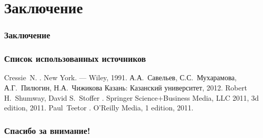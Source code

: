 \documentclass{beamer}
\begin{document}
\section{Заключение}
\begin{frame}
  \frametitle{Заключение}
\end{frame}

\begin{frame}
  \frametitle{Список использованных источников}
  \begin{scriptsize}
  \begin{thebibliography}{5}
    \beamertemplatebookbibitems
      Cressie~N.
      .
      \newblock New York. --- Wiley, 1991.
    \beamertemplatebookbibitems
      А.А.~Савельев, С.С.~Мухарамова, А.Г.~Пилюгин, Н.А.~Чижикова
      \newblock Казань: Казанский университет, 2012.
    \beamertemplatebookbibitems
      Robert H.~Shumway, David S.~Stoffer
      .
      \newblock Springer Science+Business Media, LLC 2011, 3d edition, 2011.
    \beamertemplatebookbibitems
      Paul~Teetor
      .
      \newblock O’Reilly Media, 1 edition, 2011.
  \end{thebibliography}
\end{scriptsize}
\end{frame}

%
%

\begin{frame}[c]
\begin{center}
\frametitle{\LARGE Спасибо за внимание!}

{\LARGE \inserttitle}

\bigskip

{\insertauthor} 

\bigskip\bigskip

{\insertinstitute}

\bigskip\bigskip

{\large \insertdate}
\end{center}
\end{frame}
\end{document}
